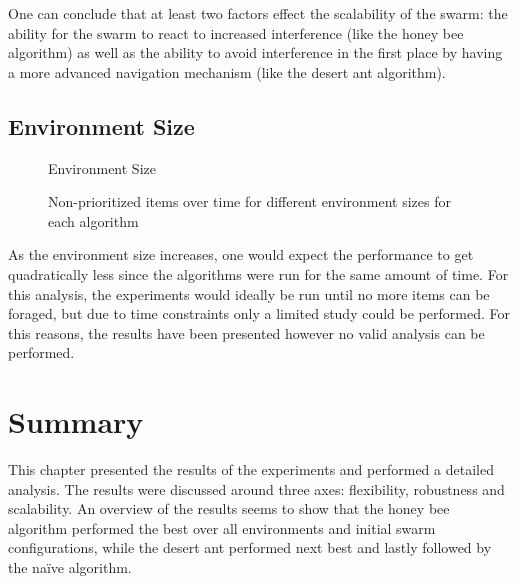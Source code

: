 One can conclude that at least two factors effect the scalability of the swarm: the ability for the swarm to react to increased interference (like the honey bee algorithm) as well as the ability to avoid interference in the first place by having a more advanced navigation mechanism (like the desert ant algorithm).

\subsection{Environment Size}
\label{results:environmentsize}




\begin{figure}[!htb]
\centering
\resizebox{\textwidth}{!}{}
\caption{Environment Size}
\label{sizegoldplot}
\end{figure}

\begin{figure}[!htb]
\centering
\resizebox{\textwidth}{!}{}
\caption{Non-prioritized items over time for different environment sizes for each algorithm}
\label{sizewasteplot}
\end{figure}

As the environment size increases, one would expect the performance to get quadratically less since the algorithms were run for the same amount of time. For this analysis, the experiments would ideally be run until no more items can be foraged, but due to time constraints only a limited study could be performed. For this reasons, the results have been presented however no valid analysis can be performed.

\section{Summary}
\label{results:summary}

This chapter presented the results of the experiments and performed a detailed analysis. The results were discussed around three axes: flexibility, robustness and scalability. An overview of the results seems to show that the honey bee algorithm performed the best over all environments and initial swarm configurations, while the desert ant performed next best and lastly followed by the na\"ive algorithm. 

